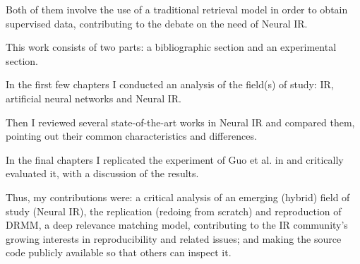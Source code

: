 Both of them involve the use of a traditional retrieval model in order to obtain supervised data, contributing to the debate on the need of Neural IR.

This work consists of two parts: a bibliographic section and an experimental section.

In the first few chapters I conducted an analysis of the field(s) of study: IR, artificial neural networks and Neural IR.

Then I reviewed several state-of-the-art works in Neural IR and compared them, pointing out their common characteristics and differences.

In the final chapters I replicated the experiment of Guo et al. in \cite{drmm} and critically evaluated it, with a discussion of the results.

Thus, my contributions were: a critical analysis of an emerging (hybrid) field of study (Neural IR), the replication (redoing from scratch) and reproduction of DRMM, a deep relevance matching model, contributing to the IR community's growing interests in reproducibility and related issues; and making the source code publicly available so that others can inspect it.